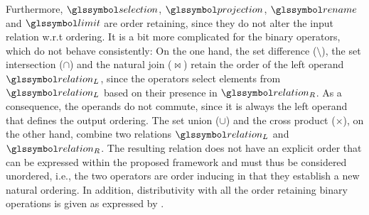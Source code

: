 Furthermore, $\selection$, $\projection$, $\rename$ and $\limit$ are order retaining, since they do not alter the input relation w.r.t ordering. It is a bit more complicated for the binary operators, which do not behave consistently: On the one hand, the set difference ($\setminus$), the set intersection ($\cap$) and the natural join ($\Join$) retain the order of the left operand $\relation_L$, since the operators select elements from $\relation_L$ based on their presence in $\relation_R$. As a consequence, the operands do not commute, since it is always the left operand that defines the output ordering. The set union ($\cup$) and the cross product ($\times$), on the other hand, combine two relations $\relation_L$ and $\relation_R$. The resulting relation does not have an explicit order that can be expressed within the proposed framework and must thus be considered unordered, i.e., the two operators are order inducing in that they establish a new natural ordering. In addition, distributivity with all the order retaining binary operations is given as expressed by .


